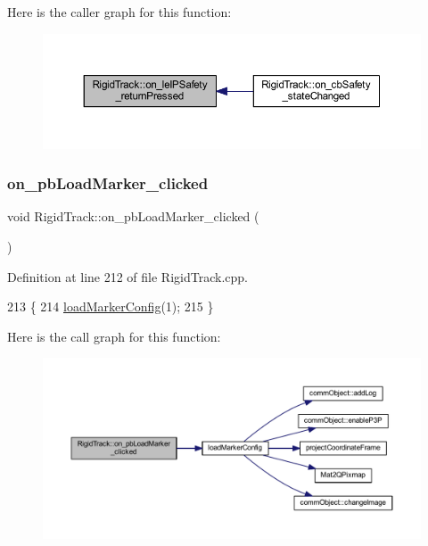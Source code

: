 Here is the caller graph for this function\+:
\nopagebreak
\begin{figure}[H]
\begin{center}
\leavevmode
\includegraphics[width=350pt]{class_rigid_track_aa527ab3a2ddc7b31bf1063260efc9755_icgraph}
\end{center}
\end{figure}
\mbox{\label{class_rigid_track_ad3e07592fbc1491cdc36dd5e817e1775}} 
\subsubsection{\texorpdfstring{on\+\_\+pb\+Load\+Marker\+\_\+clicked}{on\_pbLoadMarker\_clicked}}
{\footnotesize\ttfamily void Rigid\+Track\+::on\+\_\+pb\+Load\+Marker\+\_\+clicked (\begin{DoxyParamCaption}{ }\end{DoxyParamCaption})\hspace{0.3cm}{\ttfamily [slot]}}



Definition at line 212 of file Rigid\+Track.\+cpp.


\begin{DoxyCode}
213 \{
214     \hyperlink{main_8cpp_a56c7f641859cb2b6b99b0947d03be800}{loadMarkerConfig}(1);
215 \}
\end{DoxyCode}
Here is the call graph for this function\+:
\nopagebreak
\begin{figure}[H]
\begin{center}
\leavevmode
\includegraphics[width=350pt]{class_rigid_track_ad3e07592fbc1491cdc36dd5e817e1775_cgraph}
\end{center}
\end{figure}
\mbox{\label{class_rigid_track_a19bc46333f946e589184eeed998160da}} 
